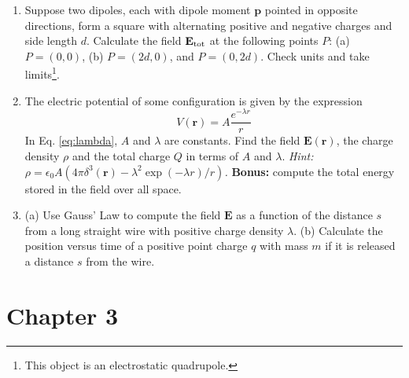 \documentclass[10pt]{article}
\begin{document}
\begin{enumerate}
\item Suppose two dipoles, each with dipole moment $\mathbf{p}$ pointed in opposite directions, form a square with alternating positive and negative charges and side length $d$.  Calculate the field $\mathbf{E}_{\rm tot}$ at the following points $P$: (a) $P = (0,0)$, (b) $P = (2d,0)$, and $P = (0,2d)$.  Check units and take limits\footnote{This object is an electrostatic quadrupole.}.
\item The electric potential of some configuration is given by the expression
\begin{equation}
V(\mathbf{r}) = A \frac{e^{-\lambda r}}{r} \label{eq:lambda}
\end{equation}
In Eq. \ref{eq:lambda}, $A$ and $\lambda$ are constants.  Find the field $\mathbf{E}(\mathbf{r})$, the charge density $\rho$ and the total charge $Q$ in terms of $A$ and $\lambda$.  \textit{Hint: $\rho = \epsilon_0 A(4\pi\delta^3(\mathbf{r}) - \lambda^2\exp(-\lambda r)/r)$.} \textbf{Bonus:} compute the total energy stored in the field over all space.
\item (a) Use Gauss' Law to compute the field $\mathbf{E}$ as a function of the distance $s$ from a long straight wire with positive charge density $\lambda$. (b) Calculate the position versus time of a positive point charge $q$ with mass $m$ if it is released a distance $s$ from the wire.
\end{enumerate}

\section{Chapter 3}
\end{document}
